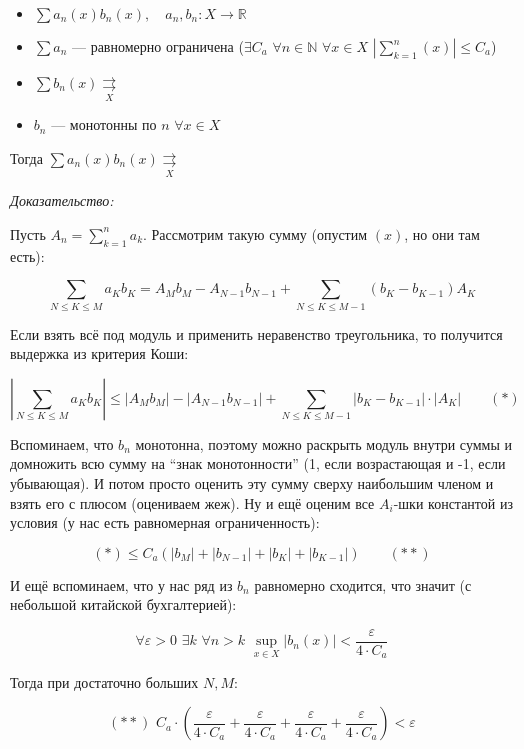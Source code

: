 \documentclass{article}
\def\dbl{\,\,}
\def\rsh#1{\underset{#1}{\rightrightarrows}}
\begin{document}
\begin{itemize}
    \item $\sum a_n(x) b_n(x), \quad a_n, b_n: X \rightarrow \mathbb{R}$
    \item $\sum a_n$ --- равномерно ограничена ($\exists C_a \dbl \forall n \in \mathbb{N} \dbl \forall x \in X \dbl \left|\sum_{k = 1}^{n}(x)\right| \le C_a$)
    \item $\sum b_n(x) \rsh{X}$
    \item $b_n$ --- монотонны по $n \dbl \forall x \in X$
\end{itemize}

Тогда $\sum a_n(x) b_n(x) \rsh{X}$

\textit{Доказательство:}

Пусть $A_n = \sum_{k = 1}^n a_k$. Рассмотрим такую сумму (опустим $(x)$, но они там есть): 

\[
    \sum_{N \le K \le M} {a_K b_K} = A_Mb_M - A_{N - 1}b_{N - 1} + \sum_{N \le K \le M - 1} {(b_K - b_{K - 1})A_K}
\]

Если взять всё под модуль и применить неравенство треугольника, то получится выдержка из критерия Коши: 

\[
    \left|\sum_{N \le K \le M} {a_K b_K}\right| \le |A_Mb_M| - |A_{N - 1}b_{N - 1}| + \sum_{N \le K \le M - 1} {\left|b_K - b_{K - 1}\right| \cdot \left|A_K\right|} \qquad (*)
\]

Вспоминаем, что $b_n$ монотонна, поэтому можно раскрыть модуль внутри суммы и домножить всю сумму на ``знак монотонности'' (1, если возрастающая и -1, если убывающая). И потом просто оценить эту сумму сверху наибольшим членом и взять его с плюсом (оцениваем жеж). Ну и ещё оценим все $A_i$-шки константой из условия (у нас есть равномерная ограниченность):

\[
    (*) \le C_a \left( |b_M| + |b_{N - 1}| + |b_{K}| + |b_{K - 1}|\right) \qquad (**)    
\]

И ещё вспоминаем, что у нас ряд из $b_n$ равномерно сходится, что значит (с небольшой китайской бухгалтерией): 

\[ \forall \varepsilon > 0 \dbl \exists k \dbl \forall n > k \dbl \sup_{x \in X} |b_n(x)| < \frac{\varepsilon}{4 \cdot C_a} \]

Тогда при достаточно больших $N, M$:

\[(**) \dbl C_a \cdot \left(\frac{\varepsilon}{4 \cdot C_a} + \frac{\varepsilon}{4 \cdot C_a} + \frac{\varepsilon}{4 \cdot C_a} + \frac{\varepsilon}{4 \cdot C_a} \right) < \varepsilon\]
\end{document}
